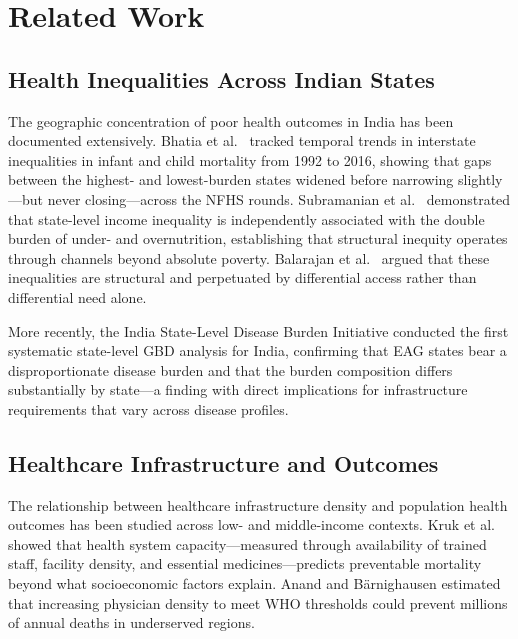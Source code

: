 \documentclass[conference]{IEEEtran}
\begin{document}
\section{Related Work}

\subsection{Health Inequalities Across Indian States}

The geographic concentration of poor health outcomes in India has been
documented extensively. Bhatia et al.\ \cite{Bhatia2018} tracked
temporal trends in interstate inequalities in infant and child mortality
from 1992 to 2016, showing that gaps between the highest- and
lowest-burden states widened before narrowing slightly---but never
closing---across the NFHS rounds. Subramanian et al.\
\cite{Subramanian2007} demonstrated that state-level income inequality
is independently associated with the double burden of under- and
overnutrition, establishing that structural inequity operates through
channels beyond absolute poverty. Balarajan et al.\ \cite{Balarajan2011}
argued that these inequalities are structural and perpetuated by
differential access rather than differential need alone.

More recently, the India State-Level Disease Burden Initiative
\cite{india_statelevelburd_2017} conducted the first systematic
state-level GBD analysis for India, confirming that EAG states bear
a disproportionate disease burden and that the burden composition
differs substantially by state---a finding with direct implications
for infrastructure requirements that vary across disease profiles.

\subsection{Healthcare Infrastructure and Outcomes}

The relationship between healthcare infrastructure density and
population health outcomes has been studied across low- and
middle-income contexts. Kruk et al.\ \cite{Kruk2018} showed that
health system capacity---measured through availability of trained
staff, facility density, and essential medicines---predicts
preventable mortality beyond what socioeconomic factors explain.
Anand and B\"{a}rnighausen \cite{Anand2004} estimated that increasing
physician density to meet WHO thresholds could prevent millions of
annual deaths in underserved regions.
\end{document}
